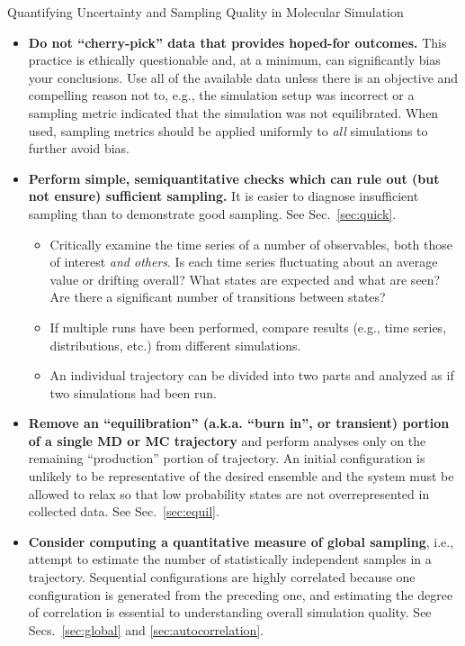 \begin{Checklists*}[p!]
\begin{checklist}{Quantifying Uncertainty and Sampling Quality in Molecular Simulation}
\begin{itemize}
\item
  \textbf{Do not ``cherry-pick'' data that provides hoped-for outcomes.}
  This practice is ethically questionable and, at a minimum, can significantly bias your conclusions.
  Use all of the available data unless there is an objective and compelling reason not to, e.g., the simulation setup was incorrect or a sampling metric indicated that the simulation was not equilibrated.
  When used, sampling metrics should be applied uniformly to \emph{all} simulations to further avoid bias.
    
\item
\textbf{Perform simple, semiquantitative checks which can rule out (but not ensure) sufficient sampling.} It is easier to diagnose insufficient sampling than to demonstrate good sampling.  See Sec.\ \ref{sec:quick}.
    \begin{itemize}
    \item Critically examine the time series of a number of observables, both those of interest \emph{and others}.
      Is each time series fluctuating about an average value or drifting overall?
      What states are expected and what are seen?
      Are there a significant number of transitions between states?
    \item If multiple runs have been performed, compare results (e.g., time series, distributions, etc.) from different simulations.
    \item An individual trajectory can be divided into two parts and analyzed as if two simulations had been run.
    \end{itemize}
    \vspace{-0.325\baselineskip} %

\item
  \textbf{Remove an ``equilibration'' (a.k.a. ``burn in'', or transient) portion of a single MD or MC trajectory} and perform analyses only on the remaining ``production'' portion of trajectory.  An initial configuration is unlikely to be representative of the desired ensemble and the system must be allowed to relax so that low probability states are not overrepresented in collected data.  See Sec.\ \ref{sec:equil}.
 
\item
  \textbf{Consider computing a quantitative measure of global sampling}, i.e., attempt to estimate the number of statistically independent samples in a trajectory.  Sequential configurations are highly correlated because one configuration is generated from the preceding one, and estimating the degree of correlation is essential to understanding overall simulation quality.
  See Secs.\ \ref{sec:global} and \ref{sec:autocorrelation}.


\end{itemize}
\end{checklist}
\end{Checklists*}
